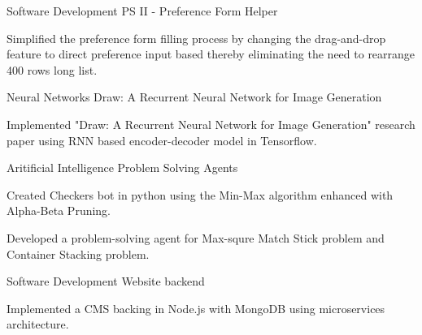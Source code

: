 

\begin{cventries}

  \cventry
    {Software Development} %
    {PS II - Preference Form Helper} %
    {} %
    {} %
    {
      \begin{cvitems}
        \item{Simplified the preference form filling process by changing the
         drag-and-drop feature to direct preference input based thereby eliminating
         the need to rearrange 400 rows long list.}
      \end{cvitems}
    }

  \cventry
    {Neural Networks} %
    {Draw: A Recurrent Neural Network for Image Generation} %
    {} %
    {} %
    {
      \begin{cvitems}
        \item{Implemented "Draw: A Recurrent Neural Network for Image Generation"
         research paper using RNN based encoder-decoder model in Tensorflow.}
      \end{cvitems}
    }

  \cventry
    {Aritificial Intelligence} %
    {Problem Solving Agents} %
    {} %
    {} %
    {
      \begin{cvitems}
        \item{Created Checkers bot in python using the Min-Max algorithm enhanced with
         Alpha-Beta Pruning.}
        \item{Developed a problem-solving agent for Max-squre Match Stick problem
         and Container Stacking problem.}
      \end{cvitems}
    }

  \cventry
    {Software Development} %
    {Website backend} %
    {} %
    {} %
    {
      \begin{cvitems}
        \item{Implemented a CMS backing in Node.js with MongoDB using microservices
         architecture.}
      \end{cvitems}
    }

\end{cventries}
